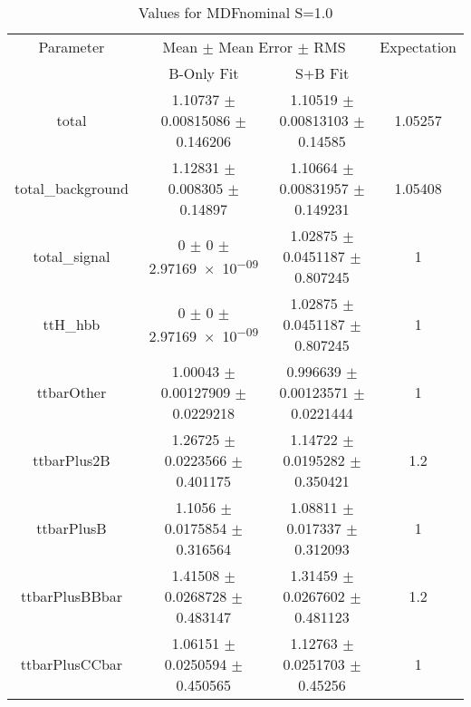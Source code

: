 \begin{table}
\centering
\caption{Values for MDFnominal S=1.0}
\begin{tabular}{cccc}
\toprule
Parameter & \multicolumn{2}{c}{Mean $\pm$ Mean Error $\pm$ RMS} & Expectation\\
 & B-Only Fit & S+B Fit & \\
\midrule
total & \num{1.10737} $\pm$ \num{0.00815086} $\pm$ \num{0.146206} & \num{1.10519} $\pm$ \num{0.00813103} $\pm$ \num{0.14585} & \num{1.05257}\\
total\_background & \num{1.12831} $\pm$ \num{0.008305} $\pm$ \num{0.14897} & \num{1.10664} $\pm$ \num{0.00831957} $\pm$ \num{0.149231} & \num{1.05408}\\
total\_signal & \num{0} $\pm$ \num{0} $\pm$ \num{2.97169e-09} & \num{1.02875} $\pm$ \num{0.0451187} $\pm$ \num{0.807245} & \num{1}\\
ttH\_hbb & \num{0} $\pm$ \num{0} $\pm$ \num{2.97169e-09} & \num{1.02875} $\pm$ \num{0.0451187} $\pm$ \num{0.807245} & \num{1}\\
ttbarOther & \num{1.00043} $\pm$ \num{0.00127909} $\pm$ \num{0.0229218} & \num{0.996639} $\pm$ \num{0.00123571} $\pm$ \num{0.0221444} & \num{1}\\
ttbarPlus2B & \num{1.26725} $\pm$ \num{0.0223566} $\pm$ \num{0.401175} & \num{1.14722} $\pm$ \num{0.0195282} $\pm$ \num{0.350421} & \num{1.2}\\
ttbarPlusB & \num{1.1056} $\pm$ \num{0.0175854} $\pm$ \num{0.316564} & \num{1.08811} $\pm$ \num{0.017337} $\pm$ \num{0.312093} & \num{1}\\
ttbarPlusBBbar & \num{1.41508} $\pm$ \num{0.0268728} $\pm$ \num{0.483147} & \num{1.31459} $\pm$ \num{0.0267602} $\pm$ \num{0.481123} & \num{1.2}\\
ttbarPlusCCbar & \num{1.06151} $\pm$ \num{0.0250594} $\pm$ \num{0.450565} & \num{1.12763} $\pm$ \num{0.0251703} $\pm$ \num{0.45256} & \num{1}\\
\bottomrule
\end{tabular}
\end{table}